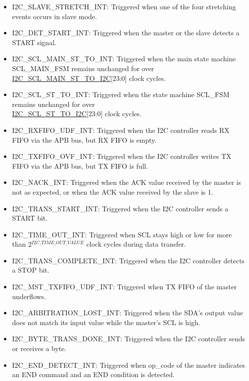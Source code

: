 \documentclass[main\_\_EN.tex]{subfiles}
\begin{document}
\begin{itemize}
\item \label{int:i2c-slave-stretch}I2C\_SLAVE\_STRETCH\_INT: Triggered when one of the four stretching events occurs in slave mode.
\item \label{int:i2c-start}I2C\_DET\_START\_INT: Triggered when the master or the slave detects a START signal.
\item \label{int:i2c-scl-main-fsm}I2C\_SCL\_MAIN\_ST\_TO\_INT: Triggered when the main state machine SCL\_MAIN\_FSM remains unchanged for over \hyperref[fielddesc:I2CSCLMAINSTTOI2C]{I2C\_SCL\_MAIN\_ST\_TO\_I2C}[23:0] clock cycles.
\item \label{int:i2c-scl-fsm}I2C\_SCL\_ST\_TO\_INT: Triggered when the state machine SCL\_FSM remains unchanged for over \\\hyperref[fielddesc:I2CSCLSTTOI2C]{I2C\_SCL\_ST\_TO\_I2C}[23:0] clock cycles.
\item \label{int:i2c-rxfifo-udf}I2C\_RXFIFO\_UDF\_INT: Triggered when the I2C controller reads RX FIFO via the APB bus, but RX FIFO is empty.
\item \label{int:i2c-txfifo-ovf}I2C\_TXFIFO\_OVF\_INT: Triggered when the I2C controller writes TX FIFO via the APB bus, but TX FIFO is full.
\item \label{int:i2c-nack}I2C\_NACK\_INT: Triggered when the ACK value received by the master is not as expected, or when the ACK value received by the slave is 1.
\item \label{int:i2c-trans-start}I2C\_TRANS\_START\_INT: Triggered when the I2C controller sends a START bit.
\item \label{int:i2c-time-out}I2C\_TIME\_OUT\_INT: Triggered when SCL stays high or low for more than 2$^{\hyperref[fielddesc:I2CTIMEOUTVALUE]{I2C\_TIME\_OUT\_VALUE}}$ clock cycles during data transfer.
\item \label{int:i2c-trans-complete}I2C\_TRANS\_COMPLETE\_INT: Triggered when the I2C controller detects a STOP bit.
\item \label{int:i2c-mst-txfifo-udf}I2C\_MST\_TXFIFO\_UDF\_INT: Triggered when TX FIFO of the master underflows.
\item \label{int:i2c-arbitration-lost}I2C\_ARBITRATION\_LOST\_INT: Triggered when the SDA's output value does not match its input value while the master's SCL is high.
\item \label{int:i2c-byte-trans-done}I2C\_BYTE\_TRANS\_DONE\_INT: Triggered when the I2C controller sends or receives a byte.
\item \label{int:i2c-end}I2C\_END\_DETECT\_INT: Triggered when op\_code of the master indicates an END command and an END condition is detected.

\end{itemize}
\end{document}
